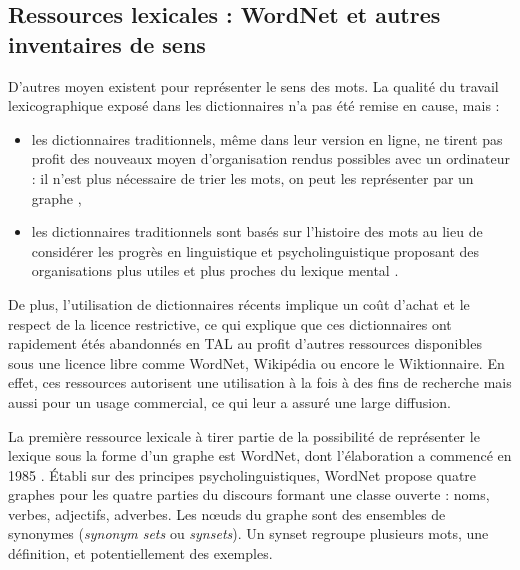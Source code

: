 \subsection{Ressources lexicales : WordNet et autres inventaires de sens}
\label{subsec:ressources_lexicales}

D'autres moyen existent pour représenter le sens des mots. La qualité du
travail lexicographique exposé dans les dictionnaires n'a pas été remise en
cause, mais :

\begin{itemize}

    \item les dictionnaires traditionnels, même dans leur version en ligne, ne
        tirent pas profit des nouveaux moyen d'organisation rendus possibles
        avec un ordinateur : il n'est plus nécessaire de trier les mots, on
        peut les représenter par un graphe
        \citep{miller1990introduction,polguere2013tissage},

    \item les dictionnaires traditionnels sont basés sur l'histoire des mots au
        lieu de considérer les progrès en linguistique et psycholinguistique
        proposant des organisations plus utiles et plus proches du lexique
        mental \citep{miller1990introduction}.

\end{itemize}

De plus, l'utilisation de dictionnaires récents implique un coût d'achat et le
respect de la licence restrictive, ce qui explique que ces dictionnaires ont
rapidement étés abandonnés en TAL au profit d'autres ressources disponibles
sous une licence libre comme WordNet, Wikipédia ou encore le Wiktionnaire. En
effet, ces ressources autorisent une utilisation à la fois à des fins de
recherche mais aussi pour un usage commercial, ce qui leur a assuré une large
diffusion.

La première ressource lexicale à tirer partie de la possibilité de représenter
le lexique sous la forme d'un graphe est WordNet, dont l'élaboration a commencé
en 1985 \citep{miller1990introduction}. Établi sur des principes
psycholinguistiques, WordNet propose quatre graphes pour les quatre parties du
discours formant une classe ouverte : noms, verbes, adjectifs, adverbes. Les
nœuds du graphe sont des ensembles de synonymes (\emph{synonym sets} ou
\emph{synsets}). Un synset regroupe plusieurs mots, une définition, et
potentiellement des exemples.


